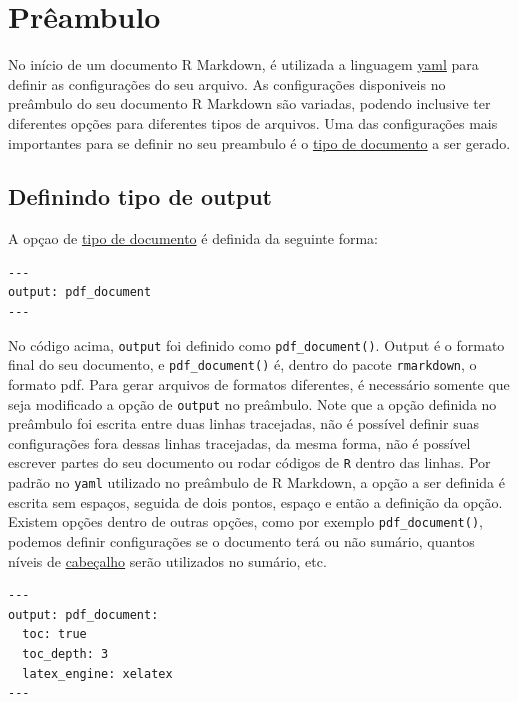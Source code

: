 \documentclass[
]{book}
\begin{document}
\hypertarget{pruxeaambulo}{%
\section{Prêambulo}\label{pruxeaambulo}}

No início de um documento R Markdown, é utilizada a linguagem \href{https://pt.wikipedia.org/wiki/YAML}{yaml} para definir as configurações do seu arquivo.
As configurações disponiveis no preâmbulo do seu documento R Markdown são variadas, podendo inclusive ter diferentes opções para diferentes tipos de arquivos.
Uma das configurações mais importantes para se definir no seu preambulo é o \protect\hyperlink{possuxedveis-tipos-de-outputs}{tipo de documento} a ser gerado.

\hypertarget{definindo-tipo-de-output}{%
\subsection{Definindo tipo de output}\label{definindo-tipo-de-output}}

A opçao de \protect\hyperlink{possuxedveis-tipos-de-outputs}{tipo de documento} é definida da seguinte forma:

\begin{verbatim}
---
output: pdf_document
---
\end{verbatim}

No código acima, \texttt{output} foi definido como \texttt{pdf\_document()}. Output é o formato final do seu documento, e \texttt{pdf\_document()} é, dentro do pacote \texttt{rmarkdown}, o formato pdf. Para gerar arquivos de formatos diferentes, é necessário somente que seja modificado a opção de \texttt{output} no preâmbulo.
Note que a opção definida no preâmbulo foi escrita entre duas linhas tracejadas, não é possível definir suas configurações fora dessas linhas tracejadas, da mesma forma, não é possível escrever partes do seu documento ou rodar códigos de \texttt{R} dentro das linhas.
Por padrão no \texttt{yaml} utilizado no preâmbulo de R Markdown, a opção a ser definida é escrita sem espaços, seguida de dois pontos, espaço e então a definição da opção.
Existem opções dentro de outras opções, como por exemplo \texttt{pdf\_document()}, podemos definir configurações se o documento terá ou não sumário, quantos níveis de \protect\hyperlink{cabeuxe7alhos}{cabeçalho} serão utilizados no sumário, etc.

\begin{verbatim}
---
output: pdf_document:
  toc: true
  toc_depth: 3
  latex_engine: xelatex
---
\end{verbatim}
\end{document}
